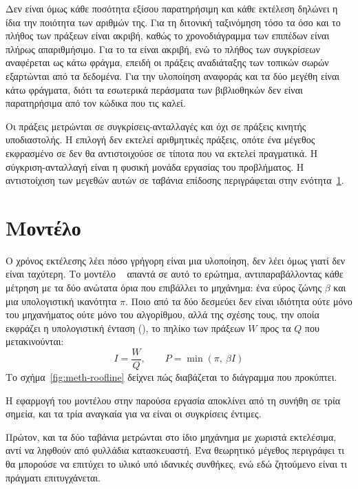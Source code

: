 Δεν είναι όμως κάθε ποσότητα εξίσου παρατηρήσιμη και κάθε εκτέλεση δηλώνει η
ίδια την ποιότητα των αριθμών της. Για τη διτονική ταξινόμηση τόσο τα
 όσο και το πλήθος των πράξεων είναι ακριβή, καθώς το χρονοδιάγραμμα
των επιπέδων είναι πλήρως απαριθμήσιμο. Για το  τα 
είναι ακριβή, ενώ το πλήθος των συγκρίσεων αναφέρεται ως κάτω φράγμα, επειδή οι
πράξεις αναδιάταξης των τοπικών σωρών εξαρτώνται από τα δεδομένα. Για την
υλοποίηση αναφοράς και τα δύο μεγέθη είναι κάτω φράγματα, διότι τα εσωτερικά
περάσματα των βιβλιοθηκών δεν είναι παρατηρήσιμα από τον κώδικα που τις καλεί.

Οι πράξεις μετρώνται σε συγκρίσεις-ανταλλαγές και όχι σε πράξεις κινητής
υποδιαστολής. Η επιλογή  δεν εκτελεί αριθμητικές πράξεις, οπότε ένα
μέγεθος εκφρασμένο σε  δεν θα αντιστοιχούσε σε τίποτα που να εκτελεί
πραγματικά. Η σύγκριση-ανταλλαγή είναι η φυσική μονάδα εργασίας του προβλήματος.
Η αντιστοίχιση των μεγεθών αυτών σε ταβάνια επίδοσης περιγράφεται στην
ενότητα~\ref{sec:meth-roofline}.

\section{Μοντέλο }
\label{sec:meth-roofline}

Ο χρόνος εκτέλεσης λέει πόσο γρήγορη είναι μια υλοποίηση, δεν λέει όμως γιατί δεν
είναι ταχύτερη. Το μοντέλο ~\cite{williams2009} απαντά σε αυτό το
ερώτημα, αντιπαραβάλλοντας κάθε μέτρηση με τα δύο ανώτατα όρια που επιβάλλει το
μηχάνημα: ένα εύρος ζώνης $\beta$ και μια υπολογιστική ικανότητα $\pi$. Ποιο από
τα δύο δεσμεύει δεν είναι ιδιότητα ούτε μόνο του μηχανήματος ούτε μόνο του
αλγορίθμου, αλλά της σχέσης τους, την οποία εκφράζει η υπολογιστική ένταση
(), το πηλίκο των πράξεων $W$ προς τα  $Q$
που μετακινούνται:
\[ I = \frac{W}{Q}, \qquad P = \min(\pi,\ \beta I) \]
Το σχήμα~\ref{fig:meth-roofline} δείχνει πώς διαβάζεται το διάγραμμα που
προκύπτει.



Η εφαρμογή του μοντέλου στην παρούσα εργασία αποκλίνει από τη συνήθη σε τρία
σημεία, και τα τρία αναγκαία για να είναι οι συγκρίσεις έντιμες.

Πρώτον, και τα δύο ταβάνια μετρώνται στο ίδιο μηχάνημα με χωριστά εκτελέσιμα,
αντί να ληφθούν από φυλλάδια κατασκευαστή. Ένα θεωρητικό μέγεθος περιγράφει τι θα
μπορούσε να επιτύχει το υλικό υπό ιδανικές συνθήκες, ενώ εδώ ζητούμενο είναι τι
πράγματι επιτυγχάνεται.

